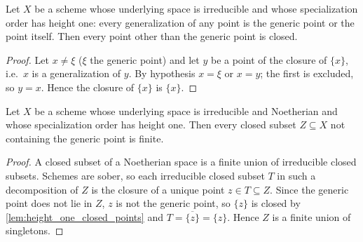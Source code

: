 \begin{lemma}
  \label{lem:height_one_closed_points}
  \leanok
  Let \(X\) be a scheme whose underlying space is irreducible and whose specialization
  order has height one: every generalization of any point is the generic point or the
  point itself. Then every point other than the generic point is closed.
\end{lemma}
\begin{proof}
  \leanok
  Let \(x \neq \xi\) (\(\xi\) the generic point) and let \(y\) be a point of the closure of
  \(\{x\}\), i.e.\ \(x\) is a generalization of \(y\). By hypothesis \(x = \xi\) or
  \(x = y\); the first is excluded, so \(y = x\). Hence the closure of \(\{x\}\) is
  \(\{x\}\).
\end{proof}

\begin{theorem}
  \label{thm:height_one_finite_closed}
  \leanok
  Let \(X\) be a scheme whose underlying space is irreducible and Noetherian and whose
  specialization order has height one. Then every closed subset \(Z \subseteq X\) not
  containing the generic point is finite.
\end{theorem}
\begin{proof}
  \leanok
  A closed subset of a Noetherian space is a finite union of irreducible closed subsets.
  Schemes are sober, so each irreducible closed subset \(T\) in such a decomposition of
  \(Z\) is the closure of a unique point \(z \in T \subseteq Z\). Since the generic point
  does not lie in \(Z\), \(z\) is not the generic point, so \(\{z\}\) is closed by
  \ref{lem:height_one_closed_points} and \(T = \overline{\{z\}} = \{z\}\). Hence \(Z\) is a
  finite union of singletons.
\end{proof}

